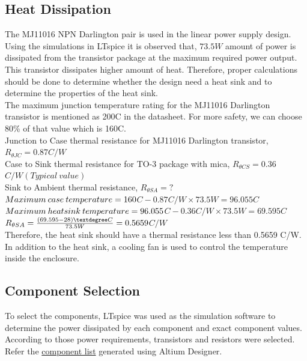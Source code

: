 \documentclass[11pt]{article}
\begin{document}
\begin{multicols}{2}
\subsection{Heat Dissipation}
The MJ11016 NPN Darlington pair is used in the linear power supply design. Using the simulations in LTspice it is observed that, $73.5W$ amount of power is dissipated from the transistor package at the maximum required power output. This transistor dissipates higher amount of heat. Therefore, proper calculations should be done to determine whether the design need a heat sink and to determine the properties of the heat sink.\\
The maximum junction temperature rating for the MJ11016 Darlington transistor is mentioned as 200\textdegree C in the datasheet. For more safety, we can choose 80\% of that value which is 160\textdegree C.\\
\newline
Junction to Case thermal resistance for MJ11016 Darlington transistor, $R_{\theta JC}  = 0.87$\textdegree$C/W$\\  
\newline
Case to Sink thermal resistance for TO-3 package with mica, $R_{\theta CS}  = 0.36$\textdegree$C/W (Typical\: value)$\\
\newline
Sink to Ambient thermal resistance, $R_{\theta SA} = ?$ \\
\newline
$Maximum \: case \: temperature \\= 160$\textdegree $C - 0.87$\textdegree $C/W \times 73.5W = 96.055$\textdegree$C$\\
\newline
$Maximum \: heat sink \: temperature\\ = 96.055$\textdegree$C - 0.36$\textdegree $C/W \times 73.5W = 69.595$\textdegree$C$\\
\newline
$  R_{\theta SA}  =\frac{(69.595 - 28)\textdegree C} {73.5W }= 0.5659$\textdegree$C/W$\\
\newline
Therefore, the heat sink should have a thermal resistance less than  0.5659 \textdegree C/W.\\
In addition to the heat sink, a cooling fan is used to control the temperature inside the enclosure.
\subsection{Component Selection}
To select the components, LTspice was used as the simulation software to determine the power dissipated by each component and exact component values. According to those power requirements, transistors and resistors were selected.\\
Refer the \textcolor{blue}{\hyperlink{page.9}{component list}} generated using Altium Designer.


\end{multicols}
\end{document}
